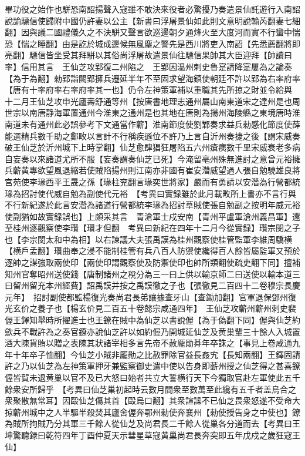 畢功役之始作也駢恐南詔揚聲入寇雖不敢決來役者必驚擾乃奏遣景仙託遊行入南詔說諭驃信使歸附中國仍許妻以公主【新書曰浮屠景仙如此則文意明說輸芮翻妻七細翻】因與議二國禮儀久之不決駢又聲言欲巡邊朝夕通烽火至大度河而實不行蠻中惴恐【惴之睡翻】由是訖於城成邊候無風塵之警先是西川將吏入南詔【先悉薦翻將即亮翻】驃信皆坐受其拜駢以其俗尚浮屠故遣景仙往驃信果帥其大臣迎拜【帥讀曰率】信用其言　王仙芝攻郢復二州陷之　王郢因温州刺史魯寔請降寔屢為之論奏【為于為翻】勑郢詣闕郢擁兵遷延半年不至固求望海鎮使朝廷不許以郢為右率府率【唐有十率府率右率府率其一也】仍令左神策軍補以重職其先所掠之財並令給與　十二月王仙芝攻申光廬壽舒通等州【按唐書地理志通州屬山南東道宋之達州是也周世宗以南唐静海軍置通州今淮東之通州是也其地在唐則為揚州海陵縣之東境唐時淮南道未有通州此必誤參考下文通當作蘄】淮南節度使劉鄴奏求益兵勑感化節度使薛能選精兵數千助之鄭畋以言計不行稱疾遜位不許乃上言自沂州奏捷之後【謂宋威奏破王仙芝於沂州城下上時掌翻】仙芝愈肆猖狂屠陷五六州瘡痍數千里宋威衰老多病自妄奏以來諸道尤所不服【妄奏謂奏仙芝已死】今淹留亳州殊無進討之意曾元裕擁兵蘄黄專欲望風退縮若使賊陷揚州則江南亦非國有崔安濳威望過人張自勉驍雄良將宫苑使李瑑西平王晟之孫【瑑柱兖翻言瑑奕世將家】嚴而有勇請以安濳為行營都統瑑為招討使代威自勉為副使代元裕　【考異曰實録雖於此月載畋所上書亦不言行與不行新紀遂於此言安濳為諸道行營都統李瑑為招討草賊使張自勉副之按明年威元裕使副猶如故實録誤也】上頗采其言　青滄軍士戍安南【青州平盧軍滄州義昌軍】還至桂州逐觀察使李瓚【瓚才但翻　考異曰新紀在四年十二月今從實録】瓚宗閔之子也【李宗閔太和中為相】以右諫議大夫張禹謨為桂州觀察使桂管監軍李維周驕横【横戶孟翻】瓚曲奉之浸不能制桂管有兵八百人防禦使纔得百人餘皆屬監軍又預於逐帥之謀強取兩使印【兩使印謂觀察使及防禦使印也帥所類翻使疏吏翻下同】擅補知州官奪昭州送使錢【唐制諸州之稅分為三一曰上供以輸京師二曰送使以輸本道三曰留州留充本州經費】詔禹謨并按之禹謨徹之子也【張徹見二百四十二卷穆宗長慶元年】　招討副使都監楊復光奏尚君長弟讓據查牙山【查鋤加翻】官軍退保鄧州復光玄价之養子也【楊玄价見二百五十卷懿宗咸通四年】　王仙芝攻蘄州蘄州刺史裴偓王鐸知舉時所擢進士也王鐐在賊中為仙芝以書說偓【為于偽翻下同】偓與仙芝約歛兵不戰許為之奏官鐐亦說仙芝許以如約偓乃開城延仙芝及黄巢輩三十餘人入城置酒大陳貨賄以贈之表陳其狀諸宰相多言先帝不赦龎勛朞年卒誅之【事見上卷咸通九年十年卒子恤翻】今仙芝小賊非龎勛之比赦罪除官益長姦宄【長知兩翻】王鐸固請許之乃以仙芝為左神策軍押牙兼監察御史遣中使以告身即蘄州授之仙芝得之甚喜鐐偓皆賀未退黄巢以官不及已大怒曰始者共立大誓横行天下今獨取官赴左軍使此五千餘衆安所歸乎　【考異曰仙芝巢初起時云數月間衆至數萬至此纔有五千者盖烏合之衆聚散無常耳】因毆仙芝傷其首【毆烏口翻】其衆諠譟不已仙芝畏衆怒遂不受命大掠蘄州城中之人半驅半殺焚其廬舍偓奔鄂州勑使奔襄州【勑使授告身之中使也】鐐為賊所拘賊乃分其軍三千餘人從仙芝及尚君長二千餘人從巢各分道而去【考異曰王坤驚聽録曰乾符四年丁酉仲夏天示彗星草寇黄巢尚君長奔突即五年戊戍之歲狂寇王仙】

